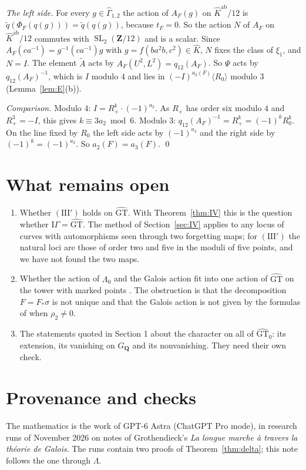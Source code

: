 \documentclass[11pt,a4paper]{article}
\theoremstyle{plain}
\theoremstyle{definition}
\theoremstyle{remark}
\newcommand{\GT}{\widehat{\mathrm{GT}}}
\newcommand{\GTz}{\widehat{\mathrm{GT}}_0}
\newcommand{\Z}{\mathbf Z}
\newcommand{\GQ}{G_{\mathbf Q}}
\newcommand{\Gh}{\widehat\Gamma}
\newcommand{\SL}{\operatorname{SL}}
\newcommand{\ab}{\mathrm{ab}}
\begin{document}
\emph{The left side.} For every $g\in\Gh_{1,2}$ the action of $A_F(g)$ on $\widehat K^{\ab}/12$ is
$\tilde q(\Phi_F(q(g)))=\tilde q(q(g))$, because $t_F=0$. So the action $N$ of $A_F$ on $\widehat K^{\ab}/12$
commutes with $\SL_2(\Z/12)$ and is a scalar. Since $A_F(ca^{-1})=g^{-1}(ca^{-1})g$ with
$g=f(ba^2b,c^2)\in\widehat K$, $N$ fixes the class of $\xi_1$, and $N=I$. The element $\tilde A$ acts by
$A_F(U^2,L^2)=q_{12}(A_F)$. So $\Psi$ acts by $q_{12}(A_F)^{-1}$, which is $I$ modulo $4$ and lies in
$(-I)^{a_3(F)}\langle R_0\rangle$ modulo $3$ (Lemma~\ref{lem:E}(b)).

\emph{Comparison.} Modulo $4$: $I=R_+^k\cdot(-1)^{a_2}$. As $R_+$ has order six modulo $4$ and $R_+^3=-I$, this
gives $k\equiv3a_2\bmod6$. Modulo $3$: $q_{12}(A_F)^{-1}=R_+^k=(-1)^kR_0^k$. On the line fixed by $R_0$ the left
side acts by $(-1)^{a_3}$ and the right side by $(-1)^k=(-1)^{a_2}$. So $a_2(F)=a_3(F)$. \qed

\section{What remains open}

\begin{enumerate}
\item Whether $(\mathrm{III}')$ holds on $\GT$. With Theorem~\ref{thm:IV} this is the question whether
$\mathrm{I}\Gamma=\GT$. The method of Section~\ref{sec:IV} applies to any locus of curves with automorphisms seen
through two forgetting maps; for $(\mathrm{III}')$ the natural loci are those of order two and five in the moduli
of five points, and we have not found the two maps.
\item Whether the action of $\Lambda_0$ and the Galois action fit into one action of $\GT$ on the tower with
marked points \cite[\S8]{LNS}. The obstruction is that the decomposition $F=F_*\sigma$ is not unique and that the
Galois action is not given by the formulas of \cite{HLS} when $\rho_2\ne0$.
\item The statements quoted in Section 1 about the character on all of $\GTz$: its extension, its vanishing on
$\GQ$ and its nonvanishing. They need their own check.
\end{enumerate}

\section*{Provenance and checks}

The mathematics is the work of GPT-6 Astra (ChatGPT Pro mode), in research runs of November 2026 on notes of
Grothendieck's \emph{La longue marche \`a travers la th\'eorie de Galois}. The runs contain two proofs of
Theorem~\ref{thm:delta}; this note follows the one through $\Lambda$.
\end{document}
